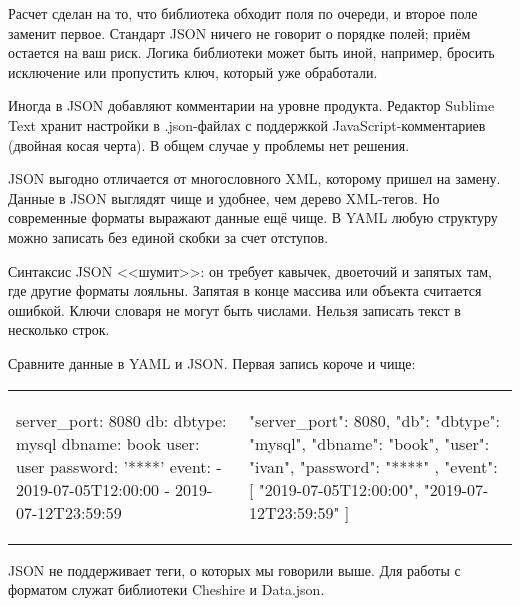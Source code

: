 Расчет сделан на то, что библиотека обходит поля по очереди, и второе поле
заменит первое. Стандарт JSON ничего не говорит о порядке полей; при\"{е}м остается
на ваш риск. Логика библиотеки может быть иной, например, бросить исключение или
пропустить ключ, который уже обработали.

Иногда в JSON добавляют комментарии на уровне продукта. Редактор Sublime Text
хранит настройки в .json-файлах с поддержкой JavaScript-комментариев (двойная
косая черта). В общем случае у проблемы нет решения.

JSON выгодно отличается от многословного XML, которому пришел на замену. Данные
в JSON выглядят чище и удобнее, чем дерево XML-тегов. Но современные форматы
выражают данные ещ\"{е} чище. В YAML любую структуру можно записать без единой
скобки за счет отступов.

Синтаксис JSON <<шумит>>: он требует кавычек, двоеточий и запятых там, где
другие форматы лояльны. Запятая в конце массива или объекта считается
ошибкой. Ключи словаря не могут быть числами. Нельзя записать текст в несколько
строк.

Сравните данные в YAML и JSON. Первая запись короче и чище:

\noindent
\begin{tabular}{ @{}p{5cm} @{}p{5cm} }

\vspace{1.25em}

\begin{english}
  \begin{yaml}
server_port: 8080
db:
  dbtype:   mysql
  dbname:   book
  user:     user
  password: '****'
event:
  - 2019-07-05T12:00:00
  - 2019-07-12T23:59:59
  \end{yaml}
\end{english}

&

\begin{english}
  \begin{json}
{
    "server_port": 8080,
    "db": {
        "dbtype":   "mysql",
        "dbname":   "book",
        "user":     "ivan",
        "password": "****"
    },
    "event": [
        "2019-07-05T12:00:00",
        "2019-07-12T23:59:59"
    ]
}
  \end{json}
\end{english}

\end{tabular}


JSON не поддерживает теги, о которых мы говорили выше. Для работы с форматом
служат библиотеки Cheshire и
Data.json.

